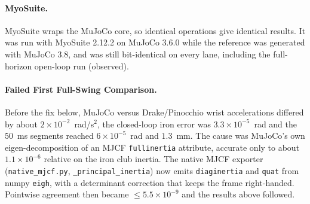 \documentclass[11pt,a4paper]{article}
\begin{document}
\paragraph{MyoSuite.}  MyoSuite wraps the MuJoCo core, so identical operations
give identical results.  It was run with MyoSuite 2.12.2 on MuJoCo 3.6.0 while
the reference was generated with MuJoCo 3.8, and was still bit-identical on
every lane, including the full-horizon open-loop run (observed).

\paragraph{Failed First Full-Swing Comparison.}  Before the fix below, MuJoCo
versus Drake/Pinocchio wrist accelerations differed by about
$2\times10^{-2}$~rad/s$^2$, the closed-loop iron error was $3.3\times10^{-5}$~rad
and the $50$~ms segments reached $6\times10^{-5}$~rad and $1.3$~mm.  The cause
was MuJoCo's own eigen-decomposition of an MJCF \texttt{fullinertia} attribute,
accurate only to about $1.1\times10^{-6}$ relative on the iron club inertia.
The native MJCF exporter (\texttt{native\_mjcf.py}, \texttt{\_principal\_inertia})
now emits \texttt{diaginertia} and \texttt{quat} from numpy \texttt{eigh}, with a
determinant correction that keeps the frame right-handed.  Pointwise agreement
then became $\le5.5\times10^{-9}$ and the results above followed.
\end{document}
